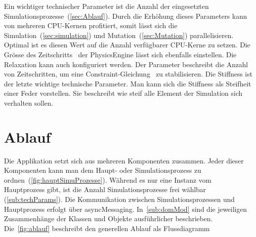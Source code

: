       Ein wichtiger technischer Parameter ist die Anzahl der eingesetzten Simulationsprozesse~(\vref{sec:Ablauf}).
      Durch die Erhöhung dieses Parameters kann von mehreren CPU-Kernen profitiert,
      somit lässt sich die Simulation~(\vref{sec:simulation}) und Mutation~(\vref{sec:Mutation}) parallelisieren.
      Optimal ist es diesen Wert auf die Anzahl verfügbarer CPU-Kerne zu setzen.
      Die Grösse des Zeitschritts~\cite{bullet:steppingTheWorld} der \gls{PhysicsEngine} lässt sich ebenfalls einstellen.
      Die Relaxation kann auch konfiguriert werden.
      Der Parameter beschreibt die Anzahl von Zeitschritten,
      um eine Constraint-Gleichung~\cite{gamedev:constraints} zu stabilisieren.
      Die Stiffness ist der letzte wichtige technische Parameter.
      Man kann sich die Stiffness als Steifheit einer Feder vorstellen.
      Sie beschreibt wie steif alle Element der Simulation sich verhalten sollen.

  \section{Ablauf\label{sec:Ablauf}}

    Die Applikation setzt sich aus mehreren Komponenten zusammen.
    Jeder dieser Komponenten kann man dem Haupt- oder Simulationsprozess zu ordnen~(\vref{fig:hauptSimuProzesse}).
    Während es nur eine Instanz vom Hauptprozess gibt,
    ist die Anzahl Simulationsprozesse frei wählbar (\vref{sub:techParams}).
    Die Kommunikation zwischen Simulationsprozessen und Hauptprozess erfolgt über \gls{asyncMessaging}.
    In~\vref{sub:domMod} sind die jeweiligen Zusammenhänge der Klassen und Objekte ausführlicher beschrieben.
    Die~\vref{fig:ablauf} beschreibt den generellen Ablauf als Flussdiagramm


